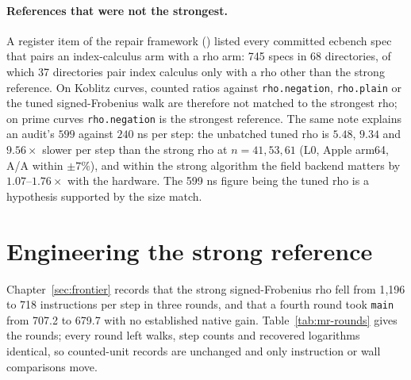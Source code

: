 \begin{table}[t]
\centering\small
\setlength{\tabcolsep}{3.5pt}

\caption[]{The negation-map audit, per curve: 64 verified runs per arm and
curve, one session (\texttt{ECBS1h83b97eccdcda}, L0). Mean $S$ in GAE per
$\sqrt r$ with its 95\% interval; $S$/theory against $\sqrt{\pi/4}$ and
$\sqrt{\pi/2}$; wall: median ms per solve. $w$ columns: mean $S$ with each
unpriced canonicalisation charged $w$ GAE. Plain/neg.: paired ratio,
cluster 95\% interval. Sources:
,
,
.
Data: .}
\label{tab:fr-negaudit}
\end{table}

\paragraph{References that were not the strongest.} A register item of the
repair framework () listed every
committed ecbench spec that pairs an index-calculus arm with a rho arm:
745 specs in 68 directories, of which 37 directories pair index calculus
only with a rho other than the strong reference. On Koblitz curves, counted
ratios against \texttt{rho.negation}, \texttt{rho.plain} or the tuned
signed-Frobenius walk are therefore not matched to the strongest rho; on
prime curves \texttt{rho.negation} is the strongest reference. The same
note explains an audit's $599$ against $240$ ns per step: the unbatched
tuned rho is $5.48$, $9.34$ and $9.56\times$ slower per step than the strong
rho at $n=41,53,61$ (L0, Apple arm64, A/A within $\pm7\%$), and within the
strong algorithm the field backend matters by $1.07$--$1.76\times$ with the
hardware. The 599 ns figure being the tuned rho is a hypothesis supported
by the size match.

\section{Engineering the strong reference}\label{sec:mr-engineering}

Chapter~\ref{sec:frontier} records that the strong signed-Frobenius rho fell
from 1{,}196 to 718 instructions per step in three rounds, and that a fourth
round took \texttt{main} from 707.2 to 679.7 with no established native gain.
Table~\ref{tab:mr-rounds} gives the rounds; every round left walks, step
counts and recovered logarithms identical, so counted-unit records are
unchanged and only instruction or wall comparisons move.

